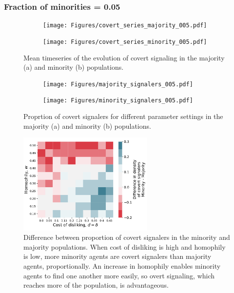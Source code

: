 \documentclass[11pt,letterpaper]{article}
\begin{document}
\subsubsection{Fraction of minorities = 0.05}

\begin{figure}[H]
  \centering
  \begin{subfigure}{0.49\textwidth}
    \centering
    \texttt{[image: Figures/covert\_series\_majority\_005.pdf]}
    \caption{}
    \label{fig:}
  \end{subfigure}
  \begin{subfigure}{0.49\textwidth}
    \centering
    \texttt{[image: Figures/covert\_series\_minority\_005.pdf]}
    \caption{}
    \label{fig:}
  \end{subfigure}
  \caption{Mean timeseries of the evolution of covert signaling in the
    majority (a) and minority (b) populations.}
  \label{fig:regressions}
\end{figure}


\begin{figure}[H]
  \centering
  \begin{subfigure}{0.49\textwidth}
    \centering
    \texttt{[image: Figures/majority\_signalers\_005.pdf]}
    \caption{}
    \label{fig:}
  \end{subfigure}
  \begin{subfigure}{0.49\textwidth}
    \centering
    \texttt{[image: Figures/minority\_signalers\_005.pdf]}
    \caption{}
    \label{fig:}
  \end{subfigure}
  \caption{Proprtion of covert signalers for different parameter settings in the
    majority (a) and minority (b) populations.}
  \label{fig:regressions}
\end{figure}

\begin{figure}[H]
  \centering
    \includegraphics[width=0.6\textwidth]{Figures/covert_signalers_diff_005.pdf}
  \caption{Difference between proportion of covert signalers in the minority 
    and majority populations. When cost of disliking is high and homophily is 
    low, more minority agents are covert signalers than majority agents,
    proportionally. An increase in homophily enables minority agents to 
    find one another more easily, so overt signaling, which reaches more of
    the population, is advantageous.
  }
  \label{fig:}
\end{figure}
\end{document}

